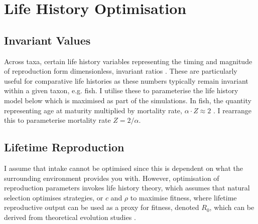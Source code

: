 \documentclass[a4paper]{article} %
\begin{document}
\section{Life History Optimisation}
\subsection{Invariant Values}
Across taxa, certain life history variables representing the timing and magnitude of reproduction form dimensionless, invariant ratios \autocite{Charnov1993}. These are particularly useful for comparative life histories as these numbers typically remain invariant within a given taxon, e.g. fish. I utilise these to parameterise the life history model below which is maximised as part of the simulations. In fish, the quantity representing age at maturity multiplied by mortality rate, $\alpha\cdot Z \approx 2$ \autocite{Charnov2001}. I rearrange this to parameterise mortality rate $Z = 2/{\alpha}$.

\subsection{Lifetime Reproduction}
I assume that intake cannot be optimised since this is dependent on what the surrounding environment provides you with. However, optimisation of reproduction parameters invokes life history theory, which assumes that natural selection optimises strategies, or $c$ and $\rho$ to maximise fitness, where lifetime reproductive output can be used as a proxy for fitness, denoted $R_0$, which can be derived from theoretical evolution studies \autocite{Charnov2001, stearns1992evolution}.
\end{document}
